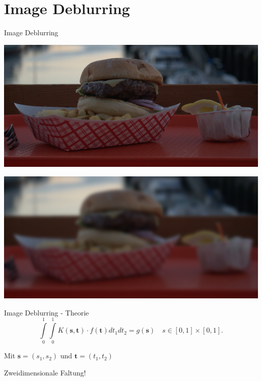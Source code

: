 \documentclass[11pt]{beamer}
\begin{document}
\section{Image Deblurring}
\begin{frame}{Image Deblurring}
\begin{center}
\includegraphics[scale=1]{Burger_unblurred} 


\includegraphics[scale=1]{Burger_blurred} 
\end{center}
\end{frame}


\begin{frame}{Image Deblurring - Theorie}
\[
\int\limits_0^1
  \int\limits_0^1
    K(\textbf{s},\textbf{t}) \cdot f(\textbf{t}) dt_1 dt_2
= g(\textbf{s})
\,\,\,\,\,\,
s \in [0,1] \times [0,1].
\]

Mit $\textbf{s} = (s_1,s_2)$ und $\textbf{t} = (t_1,t_2)$
\linebreak

Zweidimensionale Faltung!
\end{frame}
\end{document}
